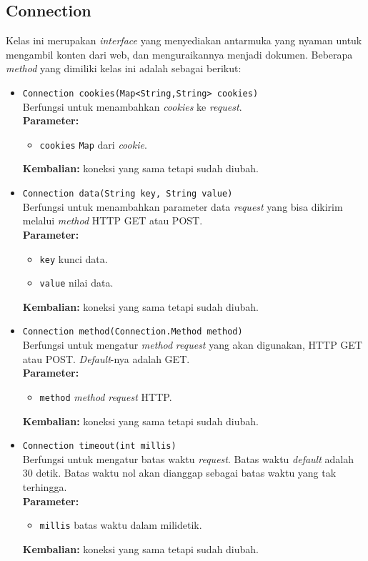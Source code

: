 \subsection{Connection}
Kelas ini merupakan \textit{interface} yang menyediakan antarmuka yang nyaman untuk mengambil konten dari web, dan menguraikannya menjadi dokumen. Beberapa \textit{method} yang dimiliki kelas ini adalah sebagai berikut:

\begin{itemize}
	\item \texttt{Connection cookies(Map<String,String> cookies)} \\
		Berfungsi untuk menambahkan \textit{cookies} ke \textit{request}. \\
		\textbf{Parameter:}
		\begin{itemize}
			\item \texttt{cookies} \texttt{Map} dari \textit{cookie}.
		\end{itemize}
		\textbf{Kembalian:} koneksi yang sama tetapi sudah diubah.
		
		\item \texttt{Connection data(String key, String value)} \\
		Berfungsi untuk menambahkan parameter data \textit{request} yang bisa dikirim melalui \textit{method} HTTP GET atau POST. \\
		\textbf{Parameter:}
		\begin{itemize}
			\item \texttt{key} kunci data.
			\item \texttt{value} nilai data.
		\end{itemize}
		\textbf{Kembalian:} koneksi yang sama tetapi sudah diubah.
		
		\item \texttt{Connection method(Connection.Method method)} \\
		Berfungsi untuk mengatur \textit{method} \textit{request} yang akan digunakan, HTTP GET atau POST. \textit{Default}-nya adalah GET.\\
		\textbf{Parameter:}
		\begin{itemize}
			\item \texttt{method} \textit{method} \textit{request} HTTP.
		\end{itemize}
		\textbf{Kembalian:} koneksi yang sama tetapi sudah diubah.
		
		\item \texttt{Connection timeout(int millis)} \\
		Berfungsi untuk mengatur batas waktu \textit{request}. Batas waktu \textit{default} adalah 30 detik. Batas waktu nol akan dianggap sebagai batas waktu yang tak terhingga. \\
		\textbf{Parameter:}
		\begin{itemize}
			\item \texttt{millis} batas waktu dalam milidetik.
		\end{itemize}
		\textbf{Kembalian:} koneksi yang sama tetapi sudah diubah.
		

\end{itemize}
